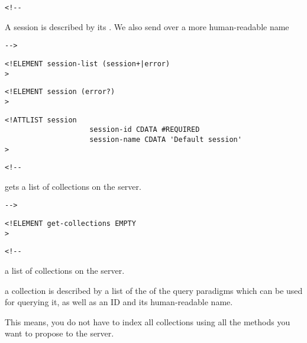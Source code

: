 \begin{verbatim}<!--\end{verbatim}
  

     
     A session is described by its . 
     We also send over a more human-readable name


       
 \begin{verbatim}-->\end{verbatim}



\begin{verbatim}
<!ELEMENT session-list (session+|error) 
>\end{verbatim}

\begin{verbatim}
<!ELEMENT session (error?) 
>\end{verbatim}

\begin{verbatim}
<!ATTLIST session 
                    session-id CDATA #REQUIRED
                    session-name CDATA 'Default session'
>\end{verbatim}

\begin{verbatim}<!--\end{verbatim}
   


     gets a list of collections on the server.

        
 \begin{verbatim}-->\end{verbatim}



\begin{verbatim}
<!ELEMENT get-collections EMPTY 
>\end{verbatim}

\begin{verbatim}<!--\end{verbatim}
    
  

     a list of collections on the server.

     a collection is described by a list of the
     of the query paradigms which can be used
     for querying it, as well as an ID and its
     human-readable name.

     This means, you do not have to index all collections using all
     the methods you want to propose to the server.

